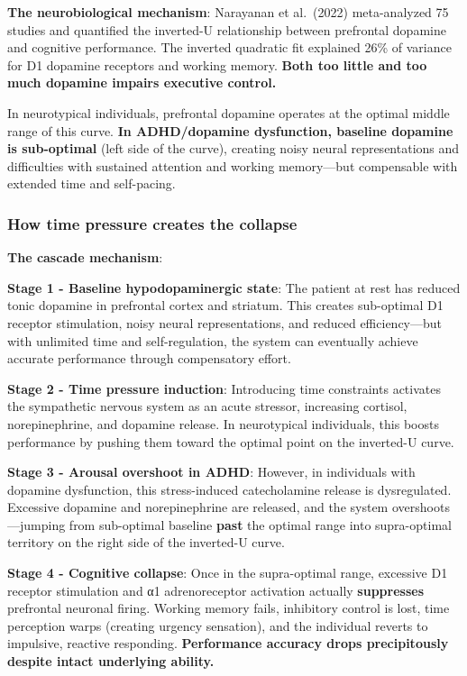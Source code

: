 \textbf{The neurobiological mechanism}: Narayanan et al.~(2022) meta-analyzed 75 studies and quantified the inverted-U relationship between prefrontal dopamine and cognitive performance. The inverted quadratic fit explained 26\% of variance for D1 dopamine receptors and working memory. \textbf{Both too little and too much dopamine impairs executive control.}

In neurotypical individuals, prefrontal dopamine operates at the optimal middle range of this curve. \textbf{In ADHD/dopamine dysfunction, baseline dopamine is sub-optimal} (left side of the curve), creating noisy neural representations and difficulties with sustained attention and working memory---but compensable with extended time and self-pacing.

\subsubsection{How time pressure creates the collapse}\label{10a_trd_basis-how-time-pressure-creates-the-collapse}

\textbf{The cascade mechanism}:

\textbf{Stage 1 - Baseline hypodopaminergic state}: The patient at rest has reduced tonic dopamine in prefrontal cortex and striatum. This creates sub-optimal D1 receptor stimulation, noisy neural representations, and reduced efficiency---but with unlimited time and self-regulation, the system can eventually achieve accurate performance through compensatory effort.

\textbf{Stage 2 - Time pressure induction}: Introducing time constraints activates the sympathetic nervous system as an acute stressor, increasing cortisol, norepinephrine, and dopamine release. In neurotypical individuals, this boosts performance by pushing them toward the optimal point on the inverted-U curve.

\textbf{Stage 3 - Arousal overshoot in ADHD}: However, in individuals with dopamine dysfunction, this stress-induced catecholamine release is dysregulated. Excessive dopamine and norepinephrine are released, and the system overshoots---jumping from sub-optimal baseline \textbf{past} the optimal range into supra-optimal territory on the right side of the inverted-U curve.

\textbf{Stage 4 - Cognitive collapse}: Once in the supra-optimal range, excessive D1 receptor stimulation and α1 adrenoreceptor activation actually \textbf{suppresses} prefrontal neuronal firing. Working memory fails, inhibitory control is lost, time perception warps (creating urgency sensation), and the individual reverts to impulsive, reactive responding. \textbf{Performance accuracy drops precipitously despite intact underlying ability.}

